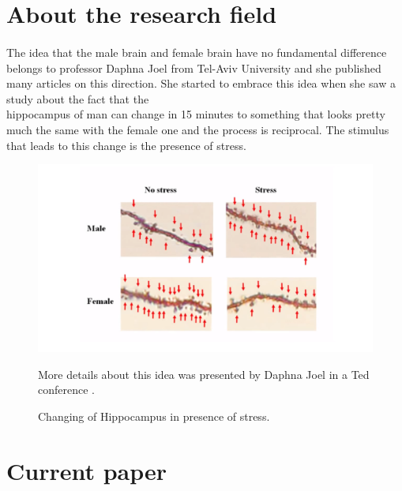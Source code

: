\documentclass[paper=a4, fontsize=11pt]{scrartcl} %
\numberwithin{equation}{section} %
\numberwithin{figure}{section} %
\numberwithin{table}{section} %
\begin{document}
\section{About the research field}\paragraph{}
	The idea that the male brain and female brain have no fundamental difference belongs to professor Daphna Joel from Tel-Aviv University and she published many articles on this direction. 
	She started to embrace this idea when she saw a study about the fact that the\\ hippocampus of man can change in 15 minutes to something that looks pretty much the same with the female one and the process is reciprocal. The stimulus that leads to this change is the presence of stress.\\
	
	
\begin{figure}[h!]
  \includegraphics[width=\linewidth]{stressVSnoStressHippocampus.png}
 	\caption{Changing of Hippocampus in presence of stress.}
 	More details about this idea was presented by Daphna Joel in a Ted conference \cite{TED}.
  \label{fig:boat1}
\end{figure}



\newpage
	\section{Current paper}
		
		
		
		
\end{document}
